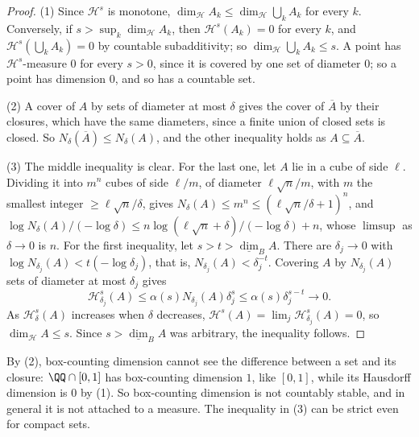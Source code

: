 \begin{proof}
(1) Since $\mathcal{H}^s$ is monotone, $\dim_{\mathcal{H}}A_k \leq \dim_{\mathcal{H}}\bigcup_kA_k$ for every $k$. Conversely, if $s > \sup_k\dim_{\mathcal{H}}A_k$, then $\mathcal{H}^s(A_k) = 0$ for every $k$, and
$\mathcal{H}^s(\bigcup_kA_k) = 0$ by countable subadditivity; so $\dim_{\mathcal{H}}\bigcup_kA_k \leq s$. A point has $\mathcal{H}^s$-measure $0$ for every $s > 0$, since it is covered by one set of
diameter $0$; so a point has dimension $0$, and so has a countable set.

(2) A cover of $A$ by sets of diameter at most $\delta$ gives the cover of $\overline A$ by their closures, which have the same diameters, since a finite union of closed sets is closed. So
$N_\delta(\overline A) \leq N_\delta(A)$, and the other inequality holds as $A \subseteq \overline A$.

(3) The middle inequality is clear. For the last one, let $A$ lie in a cube of side $\ell$. Dividing it into $m^n$ cubes of side $\ell/m$, of diameter $\ell\sqrt n/m$, with $m$ the smallest integer
$\geq \ell\sqrt n/\delta$, gives $N_\delta(A) \leq m^n \leq (\ell\sqrt n/\delta + 1)^n$, and $\log N_\delta(A)/(-\log\delta) \leq n\log(\ell\sqrt n + \delta)/(-\log\delta) + n$, whose $\limsup$ as
$\delta \to 0$ is $n$. For the first inequality, let $s > t > \underline{\dim}_BA$. There are $\delta_j \to 0$ with $\log N_{\delta_j}(A) < t(-\log\delta_j)$, that is, $N_{\delta_j}(A) < \delta_j^{-t}$.
Covering $A$ by $N_{\delta_j}(A)$ sets of diameter at most $\delta_j$ gives
\[
\mathcal{H}^s_{\delta_j}(A) \leq \alpha(s)N_{\delta_j}(A)\delta_j^s \leq \alpha(s)\delta_j^{s - t} \to 0 .
\]
As $\mathcal{H}^s_\delta(A)$ increases when $\delta$ decreases, $\mathcal{H}^s(A) = \lim_j\mathcal{H}^s_{\delta_j}(A) = 0$, so $\dim_{\mathcal{H}}A \leq s$. Since $s > \underline{\dim}_BA$ was arbitrary, the
inequality follows.
\end{proof}

By (2), box-counting dimension cannot see the difference between a set and its closure: $\QQ \cap [0, 1]$ has box-counting dimension $1$, like $[0, 1]$, while its Hausdorff dimension is $0$ by (1).
So box-counting dimension is not countably stable, and in general it is not attached to a measure. The inequality in (3) can be strict even for compact sets.

